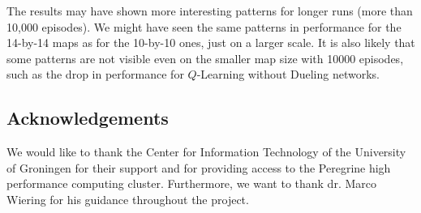 The results may have shown more interesting patterns for longer runs (more than 10,000 episodes). We might have seen the same patterns in performance for the 14-by-14 maps as for the 10-by-10 ones, just on a larger scale. It is also likely that some patterns are not visible even on the smaller map size with 10000 episodes, such as the drop in performance for $Q$-Learning without Dueling networks.

\subsection*{Acknowledgements}\label{sec:acknowledgements}
We would like to thank the Center for Information Technology of the University of Groningen for their support and for providing access to the Peregrine high performance computing cluster. Furthermore, we want to thank dr. Marco Wiering for his guidance throughout the project.
